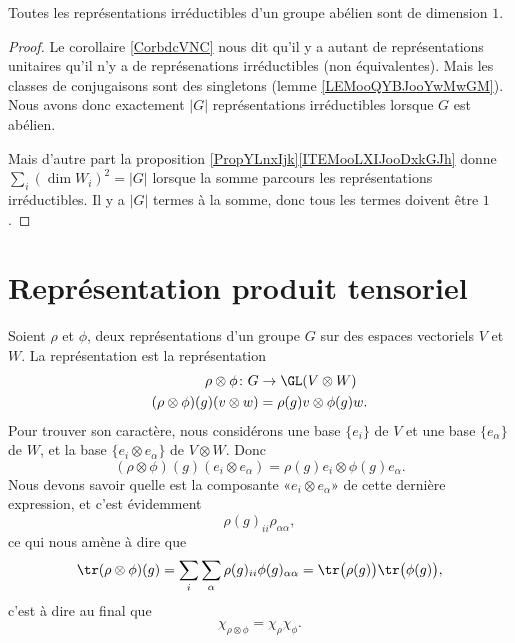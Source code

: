 \begin{corollary}       \label{CORooWAGXooByrelO}
    Toutes les représentations irréductibles d'un groupe abélien sont de dimension \( 1\).
\end{corollary}

\begin{proof}
    Le corollaire \ref{CorbdcVNC} nous dit qu'il y a autant de représentations unitaires qu'il n'y a de représenations irréductibles (non équivalentes). Mais les classes de conjugaisons sont des singletons (lemme \ref{LEMooQYBJooYwMwGM}). Nous avons donc exactement \( | G |\) représentations irréductibles lorsque \( G\) est abélien.

    Mais d'autre part la proposition \ref{PropYLnxIjk}\ref{ITEMooLXIJooDxkGJh} donne \( \sum_i(\dim W_i)^2=| G |\) lorsque la somme parcours les représentations irréductibles. Il y a \( | G |\) termes à la somme, donc tous les termes doivent être \( 1\).
\end{proof}

\section{Représentation produit tensoriel}

Soient \( \rho\) et \( \phi\), deux représentations d'un groupe \( G\) sur des espaces vectoriels \( V\) et \( W\). La représentation  est la représentation
\begin{equation}
    \begin{aligned}
        \rho\otimes\phi\colon G&\to \GL(V\otimes W) \\
        (\rho\otimes\phi)(g)(v\otimes w)&=\rho(g)v\otimes \phi(g)w. 
    \end{aligned}
\end{equation}
Pour trouver son caractère, nous considérons une base \( \{ e_i \}\) de \( V\) et une base \( \{ e_{\alpha} \}\) de \( W\), et la base \( \{ e_i\otimes e_{\alpha} \}\) de \( V\otimes W\). Donc
\begin{equation}
    (\rho\otimes \phi)(g)(e_i\otimes e_{\alpha})=\rho(g)e_i\otimes \phi(g)e_{\alpha}.
\end{equation}
Nous devons savoir quelle est la composante «\( e_i\otimes e_{\alpha}\)» de cette dernière expression, et c'est évidemment
\begin{equation}
    \rho(g)_{ii}\rho_{\alpha\alpha}, 
\end{equation}
ce qui nous amène à dire que
\begin{equation}
    \tr(\rho\otimes \phi)(g)=\sum_i\sum_{\alpha}\rho(g)_{ii}\phi(g)_{\alpha\alpha}=\tr\big( \rho(g) \big)\tr\big( \phi(g) \big),
\end{equation}
c'est à dire au final que
\begin{equation}    \label{EqOTmvfjf}
    \chi_{\rho\otimes \phi}=\chi_{\rho}\chi_{\phi}.
\end{equation}

